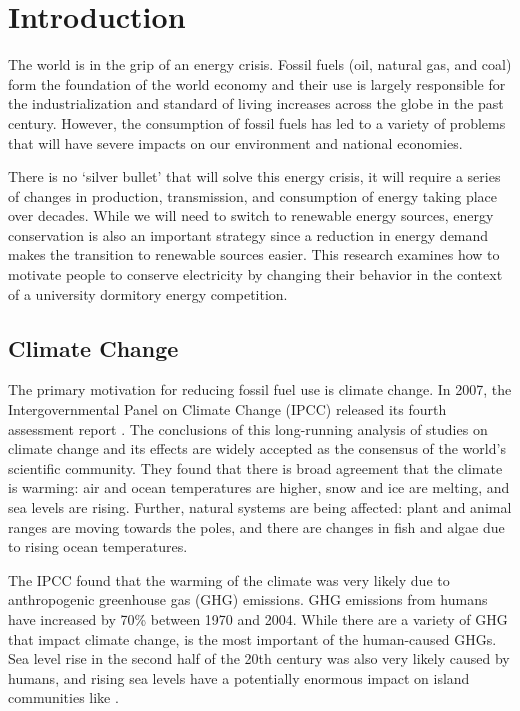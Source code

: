 \chapter{Introduction}

The world is in the grip of an energy crisis. Fossil fuels (oil, natural gas, and coal) form the foundation of the world economy and their use is largely responsible for the industrialization and standard of living increases across the globe in the past century. However, the consumption of fossil fuels has led to a variety of problems that will have severe impacts on our environment and national economies.

There is no `silver bullet' that will solve this energy crisis, it will require a series of changes in production, transmission, and consumption of energy taking place over decades. While we will need to switch to renewable energy sources, energy conservation is also an important strategy since a reduction in energy demand makes the transition to renewable sources easier. This research examines how to motivate people to conserve electricity by changing their behavior in the context of a university dormitory energy competition.

\section{Climate Change}
\label{sec:motivation}

The primary motivation for reducing fossil fuel use is climate change. In 2007, the Intergovernmental Panel on Climate Change (IPCC) released its fourth assessment report \cite{IPCC-synthesis-report-2007}. The conclusions of this long-running analysis of studies on climate change and its effects are widely accepted as the consensus of the world's scientific community. They found that there is broad agreement that the climate is warming: air and ocean temperatures are higher, snow and ice are melting, and sea levels are rising. Further, natural systems are being affected: plant and animal ranges are moving towards the poles, and there are changes in fish and algae due to rising ocean temperatures.

The IPCC found that the warming of the climate was very likely due to anthropogenic greenhouse gas (GHG) emissions. GHG emissions from humans have increased by 70\% between 1970 and 2004. While there are a variety of GHG that impact climate change, \COtwo is the most important of the human-caused GHGs. Sea level rise in the second half of the 20th century was also very likely caused by humans, and rising sea levels have a potentially enormous impact on island communities like \Hawaii.

